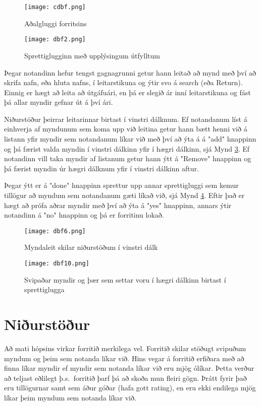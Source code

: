 \documentclass[12pt, git, draft]{rureport}
\begin{document}
\begin{figure}[h]
	\centering 
	\texttt{[image: cdbf.png]}
	\caption{Aðalgluggi forritsins \label{fig:cdbf}}
\end{figure}

\begin{figure}
	\centering 
	\texttt{[image: dbf2.png]}
	\caption{Sprettiglugginn með upplýsingum útfylltum \label{fig:dbf2}}
\end{figure}

Þegar notandinn hefur tengst gagnagrunni getur hann leitað að mynd með því að skrifa nafn, eða hluta nafns, í leitarstikuna og ýtir svo á search (eða Return). Einnig er hægt að leita að útgáfuári, en þá er slegið ár inní leitarstikuna og fást þá allar myndir gefnar út á því ári.

Niðurstöður þeirrar leitarinnar birtast í vinstri dálknum. Ef notandanum líst á einhverja af myndunum sem koma upp við leitina getur hann bætt henni við á listann yfir myndir sem notandanum líkar við með því að ýta á á "add" hnappinn og þá færist valda myndin í vinstri dálkinn yfir í hægri dálkinn, sjá Mynd \ref{fig:dbf6}. Ef notandinn vill taka myndir af listanum getur hann ýtt á "Remove" hnappinn og þá færist myndin úr hægri dálknum yfir í vinstri dálkinn aftur.

Þegar ýtt er á "done" hnappinn sprettur upp annar sprettigluggi sem kemur tillögur að myndum sem notandanum gæti líkað við, sjá Mynd \ref{fig:dbf10}. Eftir það er hægt að prófa aðrar myndir með því að ýta á "yes" hnappinn, annars ýtir notandinn á "no" hnappinn og þá er forritinu lokað.

\begin{figure}
	\centering 
	\texttt{[image: dbf6.png]}
	\caption{Myndaleit skilar niðurstöðum í vinstri dálk\label{fig:dbf6}}
\end{figure}

\begin{figure}
	\centering 
	\texttt{[image: dbf10.png]}
	\caption{Svipaðar myndir og þær sem settar voru í hægri dálkinn birtast í sprettiglugga\label{fig:dbf10}}
\end{figure}
\pagebreak
\section{Niðurstöður}
Að mati hópsins virkar forritið merkilega vel. Forritið skilar stöðugt svipuðum myndum og þeim sem notanda líkar við. Hins vegar á forritið erfiðara með að finna líkar myndir ef myndir sem notanda líkar við eru mjög ólíkar. Þetta verður að teljast eðlilegt þ.s.~forritið þarf þá að skoða mun fleiri gögn. Þrátt fyrir það eru tillögurnar samt sem áður góðar (hafa gott rating), en eru ekki endilega mjög líkar þeim myndum sem notanda líkar við.
\end{document}
